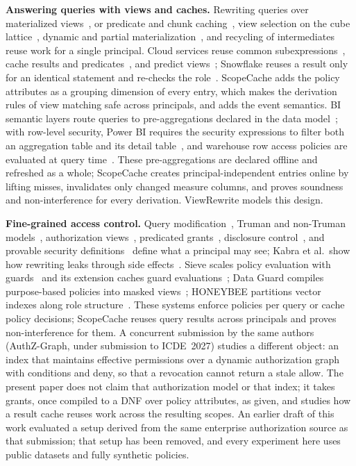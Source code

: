\documentclass[sigconf, nonacm]{acmart}
\newcommand{\M}[1]{\textsf{#1}}
\begin{document}
\textbf{Answering queries with views and caches.} Rewriting queries over materialized views~\cite{levy95,halevy01,chaudhuri95,goldstein01}, or predicate and chunk caching~\cite{keller96,deshpande98,kalnis01}, view selection on the cube lattice~\cite{hru96,mistry01}, dynamic and partial materialization~\cite{dynmv07}, and recycling of intermediates~\cite{ivanova09,nagel13,dursun17} reuse work for a single principal. Cloud services reuse common subexpressions~\cite{cloudviews18}, cache results and predicates~\cite{crystal21,predcache24,lbsc24}, and predict views~\cite{mvgpt26}; Snowflake reuses a result only for an identical statement and re-checks the role~\cite{snowflake16}. ScopeCache adds the policy attributes as a grouping dimension of every entry, which makes the derivation rules of view matching safe across principals, and adds the event semantics. BI semantic layers route queries to pre-aggregations declared in the data model~\cite{cubepreagg}; with row-level security, Power BI requires the security expressions to filter both an aggregation table and its detail table~\cite{powerbiagg}, and warehouse row access policies are evaluated at query time~\cite{snowflakerap}. These pre-aggregations are declared offline and refreshed as a whole; ScopeCache creates principal-independent entries online by lifting misses, invalidates only changed measure columns, and proves soundness and non-interference for every derivation. \M{ViewRewrite} models this design.

\textbf{Fine-grained access control.} Query modification~\cite{stonebraker74}, Truman and non-Truman models~\cite{rizvi04}, authorization views~\cite{zhang05}, predicated grants~\cite{chaudhuri07}, disclosure control~\cite{lefevre04}, and provable security definitions~\cite{guarnieri16} define what a principal may see; Kabra et al.\ show how rewriting leaks through side effects~\cite{kabra06}. Sieve scales policy evaluation with guards~\cite{sieve20} and its extension caches guard evaluations~\cite{shakya25}; Data Guard compiles purpose-based policies into masked views~\cite{dataguard26}; HONEYBEE partitions vector indexes along role structure~\cite{honeybee25}. These systems enforce policies per query or cache policy decisions; ScopeCache reuses query results across principals and proves non-interference for them. A concurrent submission by the same authors~\cite{authzgraph26} (AuthZ-Graph, under submission to ICDE~2027) studies a different object: an index that maintains effective permissions over a dynamic authorization graph with conditions and deny, so that a revocation cannot return a stale allow. The present paper does not claim that authorization model or that index; it takes grants, once compiled to a DNF over policy attributes, as given, and studies how a result cache reuses work across the resulting scopes. An earlier draft of this work evaluated a setup derived from the same enterprise authorization source as that submission; that setup has been removed, and every experiment here uses public datasets and fully synthetic policies.
\end{document}
